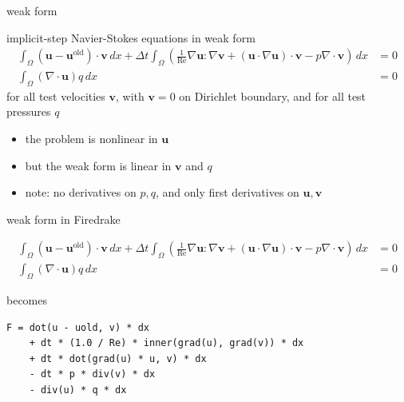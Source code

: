 \documentclass[10pt,hyperref,colorlinks]{beamer}
\newcommand{\bv}{\mathbf{v}}
\newcommand{\bu}{\mathbf{u}}
\newcommand{\grad}{\nabla}
\newcommand{\Div}{\nabla\cdot}
\renewcommand{\Re}{\text{Re}}
\newcommand{\buold}{\bu^{\text{old}}}
\newcommand{\dx}{\,dx}
\begin{document}
\begin{frame}{weak form}

\begin{block}{implicit-step Navier-Stokes equations in weak form}
\begin{align*}
\int_\Omega (\bu - \buold)\cdot \bv \dx + \Delta t \int_\Omega \left(\frac{1}{\Re}\grad \bu : \grad \bv + (\bu \cdot \grad \bu)\cdot \bv - p \Div \bv\right) \dx &= 0 \\
\int_\Omega (\Div \bu) q \dx &= 0
\end{align*}
for all test velocities $\bv$, with $\bv=0$ on Dirichlet boundary, and for all test pressures $q$
\end{block}

\begin{itemize}
\item the problem is nonlinear in $\bu$
\item but the weak form is linear in $\bv$ and $q$
\item note: no derivatives on $p,q$, and only first derivatives on $\bu,\bv$
\end{itemize}
\end{frame}


\begin{frame}[fragile]{weak form in Firedrake}

\begin{align*}
\int_\Omega (\bu - \buold)\cdot \bv \dx + \Delta t \int_\Omega \left(\frac{1}{\Re}\grad \bu : \grad \bv + (\bu \cdot \grad \bu)\cdot \bv - p \Div \bv\right) \dx &= 0 \\
\int_\Omega (\Div \bu) q \dx &= 0
\end{align*}

\medskip
becomes

\medskip
\begin{verbatim}
F = dot(u - uold, v) * dx
    + dt * (1.0 / Re) * inner(grad(u), grad(v)) * dx
    + dt * dot(grad(u) * u, v) * dx
    - dt * p * div(v) * dx
    - div(u) * q * dx
\end{verbatim}
\end{frame}
\end{document}

